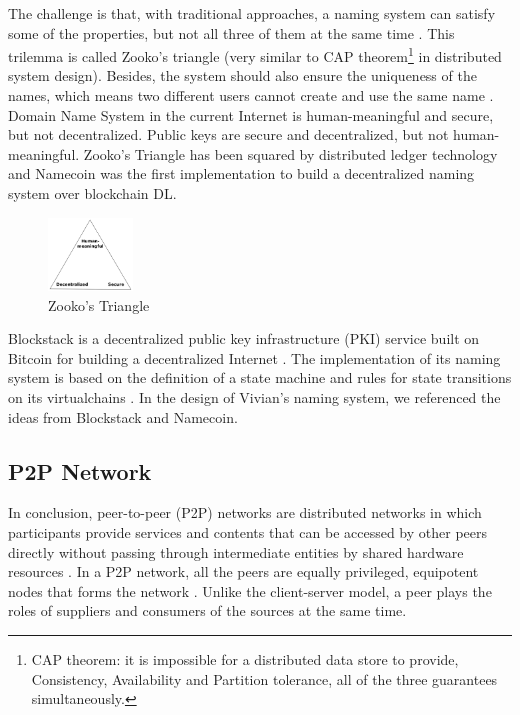 The challenge is that, with traditional approaches, a naming system can satisfy some of the properties, but not all three of them at the same time \cite{wilcox2001names}. This trilemma is called Zooko's triangle \cite{swartz_2011} (very similar to CAP theorem\footnote{CAP theorem: it is impossible for a distributed data store to provide, Consistency, Availability and Partition tolerance, all of the three guarantees simultaneously.} in distributed system design).
Besides, the system should also ensure the uniqueness of the names, which means two different users cannot create and use the same name \cite{ali2017blockstack}.
Domain Name System in the current Internet is human-meaningful and secure, but not decentralized. Public keys are secure and decentralized, but not human-meaningful.
Zooko's Triangle has been squared by distributed ledger technology \cite{swartz_2011} and Namecoin was the first implementation to build a decentralized naming system over blockchain DL.

\begin{figure}[h]
    \centering
    \includegraphics[width=0.2\textwidth,trim={0 0 0 0},clip]{figs/zooko_triangle.png}
    \caption{Zooko's Triangle}
    \label{fig:zooko_triangle}
\end{figure}

Blockstack is a decentralized public key infrastructure (PKI) service built on Bitcoin for building a decentralized Internet \cite{ali2017blockstack}.
The implementation of its naming system is based on the definition of a state machine and rules for state transitions on its virtualchains \cite{nelson2016extending, ali2016blockstack}.
In the design of Vivian's naming system, we referenced the ideas from Blockstack and Namecoin.

\subsection{P2P Network}

In conclusion, peer-to-peer (P2P) networks are distributed networks in which participants provide services and contents that can be accessed by other peers directly without passing through intermediate entities by shared hardware resources \cite{990434}.
In a P2P network, all the peers are equally privileged, equipotent nodes that forms the network \cite{nemat2011taking}. Unlike the client-server model, a peer plays the roles of suppliers and consumers of the sources at the same time.

